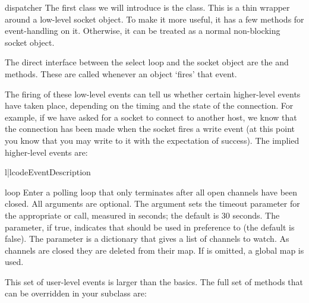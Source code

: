 \begin{classdesc}{dispatcher}{}
  The first class we will introduce is the  class. 
  This is a thin wrapper around a low-level socket object.  To make 
  it more useful, it has a few methods for event-handling on it.  
  Otherwise, it can be treated as a normal non-blocking socket object.

  The direct interface between the select loop and the socket object
  are the  and 
   methods. These are called whenever an 
  object `fires' that event.

  The firing of these low-level events can tell us whether certain 
  higher-level events have taken place, depending on the timing and 
  the state of the connection.  For example, if we have asked for a 
  socket to connect to another host, we know that the connection has 
  been made when the socket fires a write event (at this point you 
  know that you may write to it with the expectation of success).  
  The implied higher-level events are:

  \begin{tableii}{l|l}{code}{Event}{Description}
  \end{tableii}
\end{classdesc}

\begin{funcdesc}{loop}{}
  Enter a polling loop that only terminates after all open channels
  have been closed.  All arguments are optional.  The 
  argument sets the timeout parameter for the appropriate
   or  call, measured in seconds;
  the default is 30 seconds.  The  parameter, if true,
  indicates that  should be used in preference to
   (the default is false).  The  parameter
  is a dictionary that gives a list of channels to watch.  As channels
  are closed they are deleted from their map.  If  is
  omitted, a global map is used.
\end{funcdesc}

This set of user-level events is larger than the basics.  The 
full set of methods that can be overridden in your subclass are:

